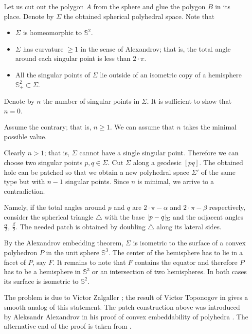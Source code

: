 Let us cut out the polygon $A$ from the sphere and glue the polygon $B$ in its place.
Denote by $\Sigma$ the obtained spherical polyhedral space.
Note that 
\begin{itemize}
\item $\Sigma$ is homeomorphic to $\mathbb S^2$.
\item $\Sigma$ has curvature $\ge 1$ in the sense of Alexandrov; that is, the total angle around each singular point is less than $2\cdot \pi$.
\item All the singular points of $\Sigma$ 
lie outside of an isometric copy of a hemisphere $\mathbb{S}^2_+\subset \Sigma$.
\end{itemize}

Denote by $n$ the number of singular points in $\Sigma$.
It is sufficient to show that $n=0$.

Assume the contrary; that is, $n\ge 1$.
We can assume that $n$ takes the minimal possible value.

Clearly $n>1$;
that is, $\Sigma$ cannot have a single singular point.
Therefore we can choose two singular points $p,q\in \Sigma$.
Cut $\Sigma$ along a geodesic $[pq]$.
The obtained hole can be patched so that we obtain a new polyhedral space $\Sigma'$ of the same type but with $n-1$ singular points.
Since $n$ is minimal, we arrive to a contradiction.

Namely, if the total angles around $p$ and $q$ are $2\cdot \pi-\alpha$ and $2\cdot \pi-\beta$ respectively,
consider the spherical triangle $\triangle$ with the base $|p\z-q|_\Sigma$ and the adjacent angles $\tfrac\alpha2$, $\tfrac\beta2$. 
The needed patch is obtained by doubling $\triangle$ along its lateral sides.
\qeds

By the Alexandrov embedding theorem, $\Sigma$ is isometric to the surface of a convex polyhedron $P$ in the unit sphere $\mathbb S^3$. 
The center of the hemisphere has to lie in a facet of $P$, say $F$.
It remains to note that $F$ contains the equator and therefore $P$ has to be a hemisphere in $\mathbb S^3$ or an intersection of two hemispheres.
In both cases its surface is isometric to $\mathbb S^2$.
\qeds

The problem is due to Victor Zalgaller \cite{zalgaller-shperical-polygon};
the result of Victor Toponogov in \cite{toponogov} gives a smooth analog of this statement.
The patch construction above was introduced by 
Aleksandr Alexandrov
in his proof of convex embeddability of polyhedra
\cite[see VI, \S7 in][]{alexandrov1948}.
The alternative end of the proof is taken from \cite{panov-petrunin}.



